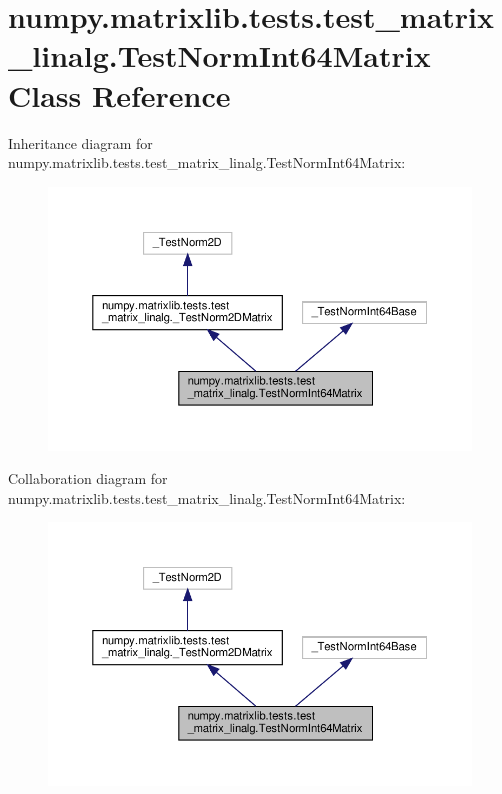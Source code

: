\hypertarget{classnumpy_1_1matrixlib_1_1tests_1_1test__matrix__linalg_1_1TestNormInt64Matrix}{}\section{numpy.\+matrixlib.\+tests.\+test\+\_\+matrix\+\_\+linalg.\+Test\+Norm\+Int64\+Matrix Class Reference}
\label{classnumpy_1_1matrixlib_1_1tests_1_1test__matrix__linalg_1_1TestNormInt64Matrix}


Inheritance diagram for numpy.\+matrixlib.\+tests.\+test\+\_\+matrix\+\_\+linalg.\+Test\+Norm\+Int64\+Matrix\+:
\nopagebreak
\begin{figure}[H]
\begin{center}
\leavevmode
\includegraphics[width=350pt]{classnumpy_1_1matrixlib_1_1tests_1_1test__matrix__linalg_1_1TestNormInt64Matrix__inherit__graph}
\end{center}
\end{figure}


Collaboration diagram for numpy.\+matrixlib.\+tests.\+test\+\_\+matrix\+\_\+linalg.\+Test\+Norm\+Int64\+Matrix\+:
\nopagebreak
\begin{figure}[H]
\begin{center}
\leavevmode
\includegraphics[width=350pt]{classnumpy_1_1matrixlib_1_1tests_1_1test__matrix__linalg_1_1TestNormInt64Matrix__coll__graph}
\end{center}
\end{figure}
